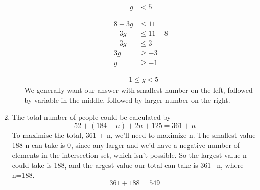 \documentclass[11pt]{article}
\begin{document}
\begin{enumerate}
\begin{enumerate}
\begin{minipage}{0.5\textwidth}
\begin{equation*}
\begin{split}
                                g&<5
                            \end{split}
                        \end{equation*}
                \end{minipage}%
                \begin{minipage}{0.5\textwidth}
                        \begin{equation*}
                            \begin{split}
                                8-3g&\leq11\\
                                -3g&\leq11-8\\
                                -3g&\leq3\\
                                3g&\geq-3\\
                                g&\geq-1
                            \end{split}
                        \end{equation*}
                \end{minipage}
                \begin{equation*}
                    \begin{split}
                        -1\leq g<5
                    \end{split}
                \end{equation*}
                We generally want our answer with smallest number on the left, followed by variable in the middle, followed by larger number on the right.
        \end{enumerate}

    \pagebreak
    \item The total number of people could be calculated by
        \begin{equation}
            52+(184-n)+2n+125=361+n
        \end{equation}
        To maximise the total, 361 + n, we'll need to maximize n.
        The smallest value 188-n can take is 0, since any larger and we'd have a negative number of elements in the intersection set, which isn't possible.
        So the largest value n could take is 188, and the argest value our total can take is 361+n, where n=188.
        \begin{equation*}
            361+188=549
        \end{equation*}


\end{enumerate}
\end{document}
